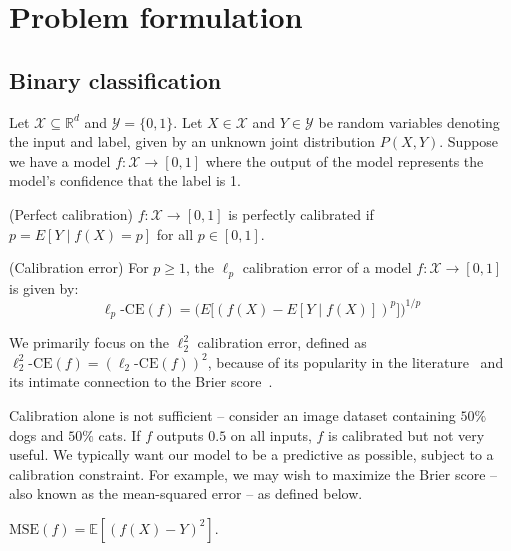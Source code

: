 \section{Problem formulation}
\label{sec:formulation}

\subsection{Binary classification}

Let $\mathcal{X} \subseteq \mathbb{R}^d$ and $\mathcal{Y} = \{0, 1\}$. Let $X \in \mathcal{X}$ and $Y \in \mathcal{Y}$ be random variables denoting the input and label, given by an unknown joint distribution $P(X, Y)$.
Suppose we have a model $f : \mathcal{X} \to [0, 1]$ where the output of the model represents the model's confidence that the label is 1.

\begin{definition}(Perfect calibration) 
$f : \mathcal{X} \to [0, 1]$ is perfectly calibrated if $p = E[Y \; | \; f(X) = p]$ for all $p \in [0, 1]$.
\end{definition}

\begin{definition}(Calibration error) 
\label{def:l2_calib_error}
For $p \geq 1$, the $\ell_p$ calibration error of a model $f : \mathcal{X} \to [0, 1]$ is given by:
\[ \ell_p\mbox{-CE}(f) = \Big(E\big[ (f(X) - E[Y \; | \; f(X)])^p \big] \Big)^{1/p} \]
\end{definition}

We primarily focus on the $\ell_2^2$ calibration error, defined as $\ell_2^2\mbox{-CE}(f) = (\ell_2\mbox{-CE}(f))^2$, because of its popularity in the literature~\cite{nguyen2015posterior, hendrycks2019anomaly, kuleshov2015calibrated, hendrycks2019pretraining} and its intimate connection to the Brier score~\cite{murphy1973vector,degroot1983forecasters}.

Calibration alone is not sufficient -- consider an image dataset containing $50\%$ dogs and $50\%$ cats.
If $f$ outputs $0.5$ on all inputs, $f$ is calibrated but not very useful.
We typically want our model to be a predictive as possible, subject to a calibration constraint.
For example, we may wish to maximize the Brier score -- also known as the mean-squared error -- as defined below.

\begin{definition}
$\mbox{MSE}(f) = \mathbb{E}[(f(X) - Y)^2]$.
\end{definition}

